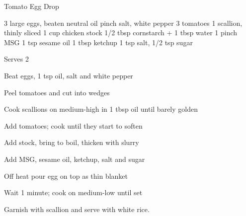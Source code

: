 \begin{denserecipe}{Tomato Egg Drop}{}
\begin{ingredients}
3 large eggs, beaten
neutral oil
pinch salt, white pepper
3 tomatoes
1 scallion, thinly sliced
1 cup chicken stock
1/2 tbsp cornstarch + 1 tbsp water
1 pinch MSG
1 tsp sesame oil
1 tbsp ketchup
1 tsp salt, 1/2 tsp sugar
\end{ingredients}
\nextcolumn
Serves 2
\begin{steps}
    \item Beat eggs, 1 tsp oil, salt and white pepper
    \item Peel tomatoes and cut into wedges
    \item Cook scallions on medium-high in 1 tbsp oil until barely golden
    \item Add tomatoes; cook until they start to soften
    \item Add stock, bring to boil, thicken with slurry
    \item Add MSG, sesame oil, ketchup, salt and sugar
    \item Off heat pour egg on top as thin blanket
    \item Wait 1 minute; cook on medium-low until set
\end{steps}
Garnish with scallion and serve with white rice.
\end{denserecipe}

